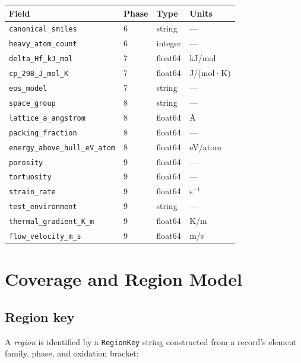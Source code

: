 \documentclass[11pt,letterpaper]{article}
\begin{document}
\begin{center}
\begin{tabular}{llll}
\toprule
Field & Phase & Type & Units \\
\midrule
\texttt{canonical\_smiles}         & 6 & string  & --- \\
\texttt{heavy\_atom\_count}        & 6 & integer & --- \\
\texttt{delta\_Hf\_kJ\_mol}        & 7 & float64 & kJ/mol \\
\texttt{cp\_298\_J\_mol\_K}        & 7 & float64 & J/(mol·K) \\
\texttt{eos\_model}                & 7 & string  & --- \\
\texttt{space\_group}              & 8 & string  & --- \\
\texttt{lattice\_a\_angstrom}      & 8 & float64 & Å \\
\texttt{packing\_fraction}         & 8 & float64 & --- \\
\texttt{energy\_above\_hull\_eV\_atom} & 8 & float64 & eV/atom \\
\texttt{porosity}                  & 9 & float64 & --- \\
\texttt{tortuosity}                & 9 & float64 & --- \\
\texttt{strain\_rate}              & 9 & float64 & s$^{-1}$ \\
\texttt{test\_environment}         & 9 & string  & --- \\
\texttt{thermal\_gradient\_K\_m}   & 9 & float64 & K/m \\
\texttt{flow\_velocity\_m\_s}      & 9 & float64 & m/s \\
\bottomrule
\end{tabular}
\end{center}

\section{Coverage and Region Model}

\subsection{Region key}

A \emph{region} is identified by a \texttt{RegionKey} string constructed
from a record's element family, phase, and oxidation bracket:
\end{document}
